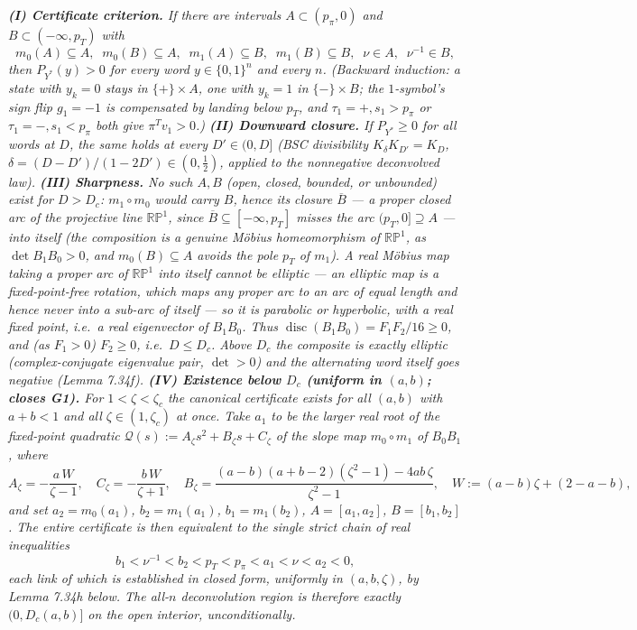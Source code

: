 \documentclass[
]{article}
\begin{document}
\emph{\textbf{(I) Certificate criterion.} If there are intervals
$A\subset(p_\pi,0)$ and $B\subset(-\infty,p_T)$ with}
\[
  m_0(A)\subseteq A,\;\; m_0(B)\subseteq A,\;\; m_1(A)\subseteq B,\;\;
  m_1(B)\subseteq B,\;\; \nu\in A,\;\; \nu^{-1}\in B,
\]
\emph{then $P_{Y^*}(y)>0$ for every word $y\in\{0,1\}^n$ and every $n$. (Backward
induction: a state with $y_k=0$ stays in $\{+\}\times A$, one with $y_k=1$ in
$\{-\}\times B$; the $1$-symbol's sign flip $g_1=-1$ is compensated by landing
below $p_T$, and $\tau_1=+,s_1>p_\pi$ or $\tau_1=-,s_1<p_\pi$ both give
$\pi^Tv_1>0$.) \textbf{(II) Downward closure.} If $P_{Y^*}\ge0$ for all words at
$D$, the same holds at every $D'\in(0,D]$ (BSC divisibility $K_\delta
K_{D'}=K_D$, $\delta=(D-D')/(1-2D')\in(0,\tfrac12)$, applied to the nonnegative
deconvolved law). \textbf{(III) Sharpness.} No such $A,B$ (open, closed, bounded, or unbounded)
exist for $D>D_c$: $m_1\circ m_0$ would carry $B$, hence its closure
$\overline B$ --- a \emph{proper} closed arc of the projective line
$\mathbb{RP}^1$, since $\overline B\subseteq[-\infty,p_T]$ misses the arc
$(p_T,0]\supseteq A$ --- into itself (the composition is a genuine M\"obius
homeomorphism of $\mathbb{RP}^1$, as $\det B_1B_0>0$, and $m_0(B)\subseteq A$
avoids the pole $p_T$ of $m_1$). A real M\"obius map taking a proper arc of
$\mathbb{RP}^1$ into itself cannot be elliptic --- an elliptic map is a
fixed-point-free rotation, which maps any proper arc to an arc of equal length
and hence never into a sub-arc of itself --- so it is parabolic or hyperbolic,
with a real fixed point, i.e.\ a real eigenvector of $B_1B_0$. Thus
$\operatorname{disc}(B_1B_0)=F_1F_2/16\ge0$, and (as $F_1>0$) $F_2\ge0$, i.e.\
$D\le D_c$. Above $D_c$ the composite is exactly elliptic (complex-conjugate
eigenvalue pair, $\det>0$) and the alternating word itself goes negative
(Lemma 7.34f).
\textbf{(IV) Existence below $D_c$ (uniform in $(a,b)$; closes G1).} For
$1<\zeta<\zeta_c$ the canonical certificate exists for \emph{all} $(a,b)$ with
$a+b<1$ and \emph{all} $\zeta\in(1,\zeta_c)$ at once. Take $a_1$ to be the
\emph{larger} real root of the fixed-point quadratic $\mathcal Q(s):=
A_\zeta s^2+B_\zeta s+C_\zeta$ of the slope map $m_0\circ m_1$ of $B_0B_1$,
where
\[
  A_\zeta=-\frac{a\,W}{\zeta-1},\quad
  C_\zeta=-\frac{b\,W}{\zeta+1},\quad
  B_\zeta=\frac{(a-b)(a+b-2)(\zeta^2-1)-4ab\,\zeta}{\zeta^2-1},\quad
  W:=(a-b)\zeta+(2-a-b),
\]
and set $a_2=m_0(a_1)$, $b_2=m_1(a_1)$, $b_1=m_1(b_2)$, $A=[a_1,a_2]$,
$B=[b_1,b_2]$. The entire certificate is then equivalent to the single strict
chain of real inequalities
\begin{equation}\label{eq:G1chain}
  b_1<\nu^{-1}<b_2<p_T<p_\pi<a_1<\nu<a_2<0,
\tag{$\ast$}
\end{equation}
each link of which is established in closed form, uniformly in $(a,b,\zeta)$, by
Lemma 7.34h below. The all-$n$ deconvolution region is therefore exactly
$(0,D_c(a,b)]$ on the open interior, unconditionally.}
\end{document}
